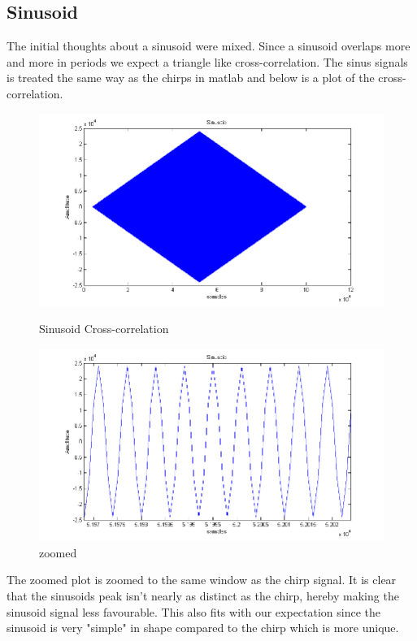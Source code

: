 \subsection{Sinusoid}
The initial thoughts about a sinusoid were mixed. Since a sinusoid overlaps more and more in periods we expect a triangle like cross-correlation. The sinus signals is treated the same way as the chirps in matlab and below is a plot of the cross-correlation.
\begin{figure}[H]
\begin{minipage}[b]{0.49\linewidth}
\centering
\includegraphics[width=1\textwidth]{billeder/sinus_xcorr_fig}
\caption{Sinusoid Cross-correlation}
\label{fig:figure1}
\end{minipage}
\hspace{0.5cm}
\begin{minipage}[b]{0.49\linewidth}
\centering
\includegraphics[width=1\textwidth]{billeder/sinus_xcorr_fig_zoom}
\caption{zoomed}
\label{fig:figure2}
\end{minipage}
\end{figure}
The zoomed plot is zoomed to the same window as the chirp signal. It is clear that the sinusoids peak isn't nearly as distinct as the chirp, hereby making the sinusoid signal less favourable. This also fits with our expectation since the sinusoid is very "simple" in shape compared to the chirp which is more unique.\\
